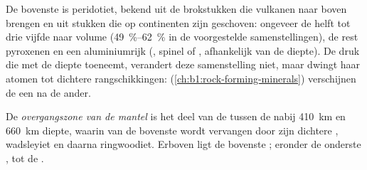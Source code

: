 De bovenste  is peridotiet, bekend uit de brokstukken die vulkanen naar boven brengen en uit stukken  die op continenten zijn geschoven: ongeveer de
helft tot drie vijfde  naar volume (\qtyrange{49}{62}{\percent} in de voorgestelde samenstellingen), de rest pyroxenen en een aluminiumrijk 
(, spinel of , afhankelijk van de diepte). De druk die met de diepte toeneemt, verandert deze samenstelling niet, maar dwingt haar atomen tot
dichtere rangschikkingen:  (\cref{ch:b1:rock-forming-minerals}) verschijnen de een na de ander.

\begin{definition}\label{def:b1:layered-earth:transition-zone}
De \emph{overgangszone van de mantel} is het deel van de  tussen de  nabij
\qty{410}{km} en \qty{660}{km} diepte, waarin  van de bovenste  wordt vervangen door zijn dichtere , wadsleyiet en daarna
ringwoodiet. Erboven ligt de bovenste ; eronder de onderste , tot de .
\end{definition}

